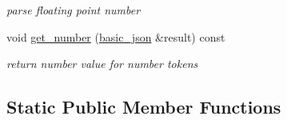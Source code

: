 \begin{DoxyCompactItemize}
$$\begin{DoxyCompactList}\small\item\em parse floating point number \end{DoxyCompactList}\item 
void \hyperlink{classnlohmann_1_1basic__json_1_1lexer_a3a9787fee5177c60bbc80d9e41282e9f_a3a9787fee5177c60bbc80d9e41282e9f}{get\-\_\-number} (\hyperlink{classnlohmann_1_1basic__json}{basic\-\_\-json} \&result) const 
\begin{DoxyCompactList}\small\item\em return number value for number tokens \end{DoxyCompactList}\end{DoxyCompactItemize}
\subsection*{Static Public Member Functions}
